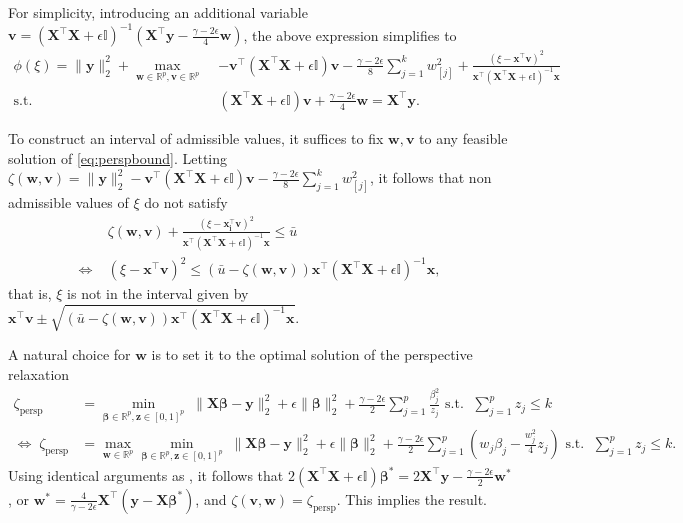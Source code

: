 \documentclass[opre,nonblindrev]{informs3} %
\begin{document}
For simplicity, introducing an additional variable $\bm{v}= \left(\bm{X}^\top \bm{X}+\epsilon\mathbb{I}\right)^{-1}\left(\bm{X}^\top \bm{y}-\frac{\gamma-2\epsilon}{4}\bm{w}\right)$, the above expression simplifies to 
\begin{equation}\label{eq:perspbound}
\begin{aligned}
	\phi(\xi)=\|\bm{y}\|_2^2+\max_{\bm{w}\in \mathbb{R}^p,\bm{v}\in \mathbb{R}^p}\;&-\bm{v}^\top \left(\bm{X}^\top \bm{X}+\epsilon\mathbb{I}\right)\bm{v}-\frac{\gamma-2\epsilon}{8}\sum_{j=1}^k w_{[j]}^2+\frac{\left(\xi-\bm{x^\top v}\right)^2}{\bm{x^\top} \left(\bm{X}^\top \bm{X}+\epsilon\mathbb{I}\right)^{-1}\bm{x}}\\
	\text{s.t.}\;&\left(\bm{X}^\top \bm{X}+\epsilon\mathbb{I}\right)\bm{v}+\frac{\gamma-2\epsilon}{4}\bm{w}=\bm{X}^\top \bm{y}.
\end{aligned}
\end{equation}

To construct an interval of admissible values, it suffices to fix $\bm{w},\bm{v}$ to any feasible solution of \eqref{eq:perspbound}. Letting $\zeta(\bm{w},\bm{v})=\|\bm{y}\|_2^2-\bm{v}^\top \left(\bm{X}^\top \bm{X}+\epsilon\mathbb{I}\right)\bm{v}-\frac{\gamma-2\epsilon}{8}\sum_{j=1}^k w_{[j]}^2$, it follows that non admissible values of $\xi$ do not satisfy
\begin{align*}&\zeta(\bm{w},\bm{v})+\frac{\left(\xi-\bm{x_i^\top v}\right)^2}{\bm{x^\top} \left(\bm{X}^\top \bm{X}+\epsilon\mathbb{I}\right)^{-1}\bm{x}}\leq \bar u\\
\Leftrightarrow\;&\left(\xi-\bm{x^\top v}\right)^2\leq \left(\bar u-\zeta(\bm{w},\bm{v})\right)\bm{x^\top} \left(\bm{X}^\top \bm{X}+\epsilon\mathbb{I}\right)^{-1}\bm{x},
\end{align*}
that is, $\xi$ is not in the interval given by $\bm{x^\top v}\pm\sqrt{\left(\bar u-\zeta(\bm{w},\bm{v})\right)\bm{x^\top} \left(\bm{X}^\top \bm{X}+\epsilon\mathbb{I}\right)^{-1}\bm{x}}$. 

A natural choice for $\bm{w}$ is to set it to the optimal solution of the perspective relaxation
\begin{align*}
	\zeta_{\text{persp}}&=\min_{\bm{\beta}\in \mathbb{R}^p,\bm{z}\in [0,1]^p}\; \|\bm{X}\bm{\beta}-\bm{y}\|_2^2+\epsilon\|\bm{\beta}\|_2^2+\frac{\gamma-2\epsilon}{2}\sum_{j=1}^p \frac{\beta_j^2}{z_j}
	\text{ s.t. }\;\sum_{j=1}^p z_j\leq k\\
\Leftrightarrow\;	\zeta_{\text{persp}}&=\max_{\bm{w}\in \mathbb{R}^p}\min_{\bm{\beta}\in \mathbb{R}^p,\bm{z}\in [0,1]^p}\; \|\bm{X}\bm{\beta}-\bm{y}\|_2^2+\epsilon\|\bm{\beta}\|_2^2+\frac{\gamma-2\epsilon}{2}\sum_{j=1}^p \left(w_j\beta_j-\frac{w_j^2}{4}z_j\right)
	\text{ s.t. }\; \sum_{j=1}^p z_j\leq k.
\end{align*}
Using identical arguments as \cite{atamturk2020safe}, it follows that $2\left(\bm{X}^\top \bm{X}+\epsilon\mathbb{I}\right)\bm{\beta^*}=2\bm{X}^\top\bm{y}-\frac{\gamma-2\epsilon}{2}\bm{w^*}$, or $\bm{w^*}=\frac{4}{\gamma-2\epsilon}\bm{X}^\top\left(\bm{y}-\bm{X}\bm{\beta}^*\right)$, and $\zeta(\bm{v},\bm{w})=\zeta_{\text{persp}}$. This implies the result. \Halmos
\endproof
\end{document}
